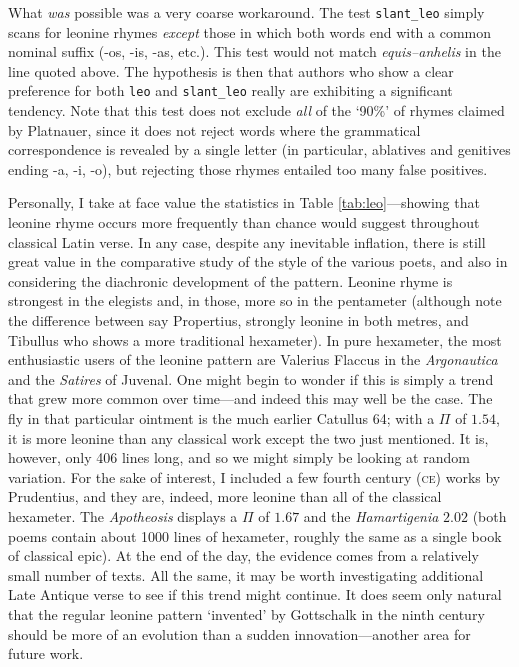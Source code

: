 \documentclass[twocolumn, switch]{article} %
\begin{document}
What \emph{was} possible was a very coarse workaround. The test
\texttt{slant\_leo} simply scans for leonine rhymes \emph{except} those in
which both words end with a common nominal suffix (-os, -is, -as, etc.). This
test would not match \emph{equis--anhelis} in the line quoted above. The
hypothesis is then that authors who show a clear preference for both
\texttt{leo} and \texttt{slant\_leo} really are exhibiting a significant
tendency. Note that this test does not exclude \emph{all} of the `90\%' of
rhymes claimed by Platnauer, since it does not reject words where the
grammatical correspondence is revealed by a single letter (in particular,
ablatives and genitives ending -a, -i, -o), but rejecting those rhymes
entailed too many false positives.

Personally, I take at face value the statistics in Table
\ref{tab:leo}---showing that leonine rhyme occurs more frequently than chance
would suggest throughout classical Latin verse. In any case, despite any
inevitable inflation, there is still great value in the comparative study of
the style of the various poets, and also in considering the diachronic
development of the pattern. Leonine rhyme is strongest in the elegists and, in
those, more so in the pentameter (although note the difference between say
Propertius, strongly leonine in both metres, and Tibullus who shows a more
traditional hexameter). In pure hexameter, the most enthusiastic users of the
leonine pattern are Valerius Flaccus in the \emph{Argonautica} and the
\emph{Satires} of Juvenal. One might begin to wonder if this is simply a trend
that grew more common over time---and indeed this may well be the case. The
fly in that particular ointment is the much earlier Catullus 64; with a $\Pi$
of $1.54$, it is more leonine than any classical work except the two just
mentioned. It is, however, only 406 lines long, and so we might simply be
looking at random variation. For the sake of interest, I included a few fourth
century (\textsc{ce}) works by Prudentius, and they are, indeed, more leonine
than all of the classical hexameter. The \emph{Apotheosis} displays a $\Pi$ of
$1.67$ and the \emph{Hamartigenia} $2.02$ (both poems contain about 1000 lines
of hexameter, roughly the same as a single book of classical epic). At the end
of the day, the evidence comes from a relatively small number of texts. All
the same, it may be worth investigating additional Late Antique verse to see
if this trend might continue. It does seem only natural that the regular
leonine pattern `invented' by Gottschalk in the ninth century should be more
of an evolution than a sudden innovation---another area for future work.
\end{document}
